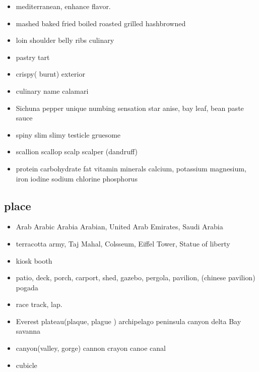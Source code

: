 \documentclass[a4paper,11pt,twoside]{book}
\begin{document}
\begin{itemize}
	\item mediterranean, enhance flavor. 
	
	\item mashed baked fried boiled roasted grilled hashbrowned 
	
	\item loin shoulder belly ribs culinary
	
	\item pastry tart 
	\item crispy( burnt) exterior
	
	\item culinary name calamari 
	
	\item Sichuna pepper unique numbing sensation  star anise, bay leaf, bean paste sauce
	\item spiny slim slimy testicle gruesome
	
	\item scallion scallop scalp scalper (dandruff)
	
	\item protein carbohydrate fat vitamin minerals calcium, potassium magnesium, iron iodine sodium chlorine phosphorus
	

	
\end{itemize}


\subsection{place}
\begin{itemize}
	\item Arab Arabic  Arabia Arabian, United Arab Emirates, Saudi Arabia
	
	\item terracotta army, Taj Mahal, Colsseum, Eiffel Tower, Statue of liberty
	
	\item kiosk booth
	
	\item patio, deck, porch, carport, shed, gazebo, pergola, pavilion, (chinese pavilion)  pogada
	
	
	\item race track, lap. 
	
	\item Everest plateau(plaque, plague ) archipelago peninsula canyon delta Bay savanna 
	
	\item canyon(valley, gorge) cannon crayon canoe canal
	
	\item cubicle 
	
\end{itemize}
\end{document}
